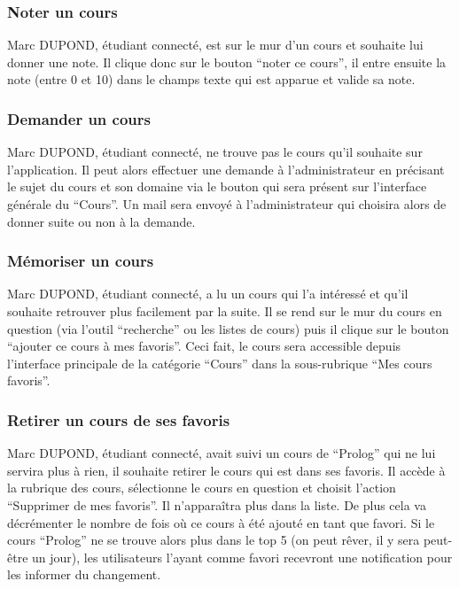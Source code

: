 \subsubsection*{Noter un cours}
Marc DUPOND, étudiant connecté, est sur le mur d’un cours et souhaite lui donner une note. Il clique donc sur le bouton “noter ce cours”, il entre ensuite la note (entre 0 et 10) dans le champs texte qui est apparue et valide sa note.
\subsubsection*{Demander un cours}
Marc DUPOND, étudiant connecté, ne trouve pas le cours qu’il souhaite sur l’application. Il peut alors effectuer une demande à l’administrateur en précisant le sujet du cours et son domaine via le bouton qui sera présent sur l’interface générale du “Cours”. Un mail sera envoyé à l’administrateur qui choisira alors de donner suite ou non à la demande.
\subsubsection*{Mémoriser un cours}
Marc DUPOND, étudiant connecté, a lu un cours qui l’a intéressé et qu’il souhaite retrouver plus facilement par la suite. Il se rend sur le mur du cours en question (via l’outil “recherche” ou les listes de cours) puis il clique sur le bouton “ajouter ce cours à mes favoris”. Ceci fait, le cours sera accessible depuis l’interface principale de la catégorie “Cours” dans la sous-rubrique “Mes cours favoris”.
\subsubsection*{Retirer un cours de ses favoris}
Marc DUPOND, étudiant connecté, avait suivi un cours de “Prolog” qui ne lui servira plus à rien, il souhaite retirer le cours qui est dans ses favoris. Il accède à la rubrique des cours, sélectionne le cours en question et choisit l’action “Supprimer de mes favoris”. Il n’apparaîtra plus dans la liste. De plus cela va décrémenter le nombre de fois où ce cours à été ajouté en tant que favori. Si le cours “Prolog” ne se trouve alors plus dans le top 5 (on peut rêver, il y sera peut-être un jour), les utilisateurs l’ayant comme favori recevront une notification pour les informer du changement.
